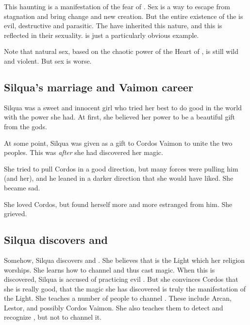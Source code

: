 This haunting is a manifestation of the \pps{\banes}{} fear of . 
Sex is a way to escape from stagnation and bring change and new creation. But the entire existence of the \banes{} is evil, destructive and parasitic. 
The \resphain{} have inherited this nature, and this is reflected in their sexuality. \Shiaraid{} is just a particularly obvious example. 

Note that natural sex, based on the chaotic power of the Heart of \Miith{}, is still wild and violent. But \resphan{} sex is worse. 









\subsection{Silqua's marriage and Vaimon career}
Silqua was a sweet and innocent girl who tried her best to do good in the world with the power she had. 
At first, she believed her power to be a beautiful gift from the gods. 


At some point, Silqua was given as a gift to Cordos Vaimon to unite the two peoples. 
This was \emph{after} she had discovered her magic. 

She tried to pull Cordos in a good direction, but many forces were pulling him (and her), and he leaned in a darker direction that she would have liked. 
She became sad. 

She loved Cordos, but found herself more and more estranged from him. 
She grieved.










\subsection{Silqua discovers \iquin{} and \itzach}
Somehow, Silqua discovers \iquin{} and \nieur{}. 
She believes that \iquin{} is the Light which her religion worships. 
She learns how to channel \iquin{} and thus cast magic. 
When this is discovered, Silqua is accused of practicing evil \dragoncraft. 
But she convinces Cordos that she is really good, that the magic she has discovered is truly the manifestation of the Light. 
She teaches a number of people to channel \iquin{}. 
These include Arcan, Lestor, \Delphine and possibly Cordos Vaimon. 
She also teaches them to detect and recognize \nieur{}, but not to channel it. 

